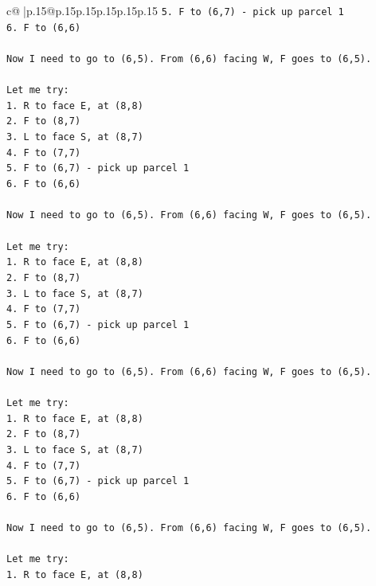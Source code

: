 \documentclass{article}
\begin{document}
{\begin{supertabular}{c@{$\;$}|p{.15\linewidth}@{}p{.15\linewidth}p{.15\linewidth}p{.15\linewidth}p{.15\linewidth}p{.15\linewidth}}
{{{\texttt{5. F to (6,7) {-} pick up parcel 1} \\
\texttt{6. F to (6,6)} \\
\\ 
\texttt{Now I need to go to (6,5). From (6,6) facing W, F goes to (6,5).} \\
\\ 
\texttt{Let me try:} \\
\texttt{1. R to face E, at (8,8)} \\
\texttt{2. F to (8,7)} \\
\texttt{3. L to face S, at (8,7)} \\
\texttt{4. F to (7,7)} \\
\texttt{5. F to (6,7) {-} pick up parcel 1} \\
\texttt{6. F to (6,6)} \\
\\ 
\texttt{Now I need to go to (6,5). From (6,6) facing W, F goes to (6,5).} \\
\\ 
\texttt{Let me try:} \\
\texttt{1. R to face E, at (8,8)} \\
\texttt{2. F to (8,7)} \\
\texttt{3. L to face S, at (8,7)} \\
\texttt{4. F to (7,7)} \\
\texttt{5. F to (6,7) {-} pick up parcel 1} \\
\texttt{6. F to (6,6)} \\
\\ 
\texttt{Now I need to go to (6,5). From (6,6) facing W, F goes to (6,5).} \\
\\ 
\texttt{Let me try:} \\
\texttt{1. R to face E, at (8,8)} \\
\texttt{2. F to (8,7)} \\
\texttt{3. L to face S, at (8,7)} \\
\texttt{4. F to (7,7)} \\
\texttt{5. F to (6,7) {-} pick up parcel 1} \\
\texttt{6. F to (6,6)} \\
\\ 
\texttt{Now I need to go to (6,5). From (6,6) facing W, F goes to (6,5).} \\
\\ 
\texttt{Let me try:} \\
\texttt{1. R to face E, at (8,8)} \\
}}}
\end{supertabular}}
\end{document}
